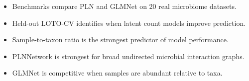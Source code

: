 \begin{itemize}
\item Benchmarks compare PLN and GLMNet on 20 real microbiome datasets.
\item Held-out LOTO-CV identifies when latent count models improve prediction.
\item Sample-to-taxon ratio is the strongest predictor of model performance.
\item PLNNetwork is strongest for broad undirected microbial interaction graphs.
\item GLMNet is competitive when samples are abundant relative to taxa.
\end{itemize}
